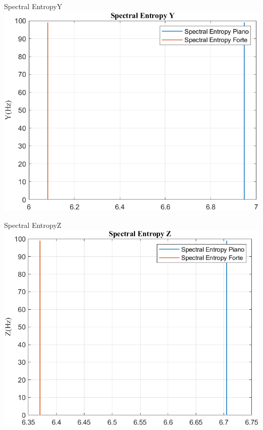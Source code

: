 	\begin{frame}{{Spectral EntropyY}}
		\centering\includegraphics[height=.8\textheight]{figure/Vel/Trasformata/Spectral EntropyY}
	\end{frame}
	
	\begin{frame}{{Spectral EntropyZ}}
		\centering\includegraphics[height=.8\textheight]{figure/Vel/Trasformata/Spectral EntropyZ}
	\end{frame}
	
